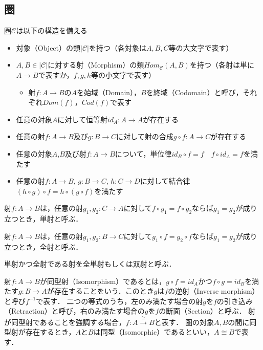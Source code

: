 \documentclass[type_judgement.tex]{subfiles}
\begin{document}
\subsection{圏}
\begin{defn}[Category（圏）]
圏$\mathcal{C}$は以下の構造を備える
\begin{itemize}
    \item 対象（Object）の類$|\mathcal{C}|$を持つ（各対象は$A,B,C$等の大文字で表す）
    \item $A,B\in|\mathcal{C}|$に対する射（Morphism）の類$Hom_\mathcal{C}(A,B)$を持つ（各射は単に$A \rightarrow B$で表すか，$f,g,h$等の小文字で表す）
        \begin{itemize}
            \item 射$f:A \rightarrow B$の$A$を始域（Domain），$B$を終域（Codomain）と呼び，それぞれ$Dom(f)$，$Cod(f)$で表す
        \end{itemize}
    \item 任意の対象$A$に対して恒等射$id_A:A \rightarrow A$が存在する
    \item 任意の射$f:A \rightarrow B$及び$g:B \rightarrow C$に対して射の合成$g \circ f: A \rightarrow C$が存在する
    \item 任意の対象$A$,$B$及び射$f:A \rightarrow B$について，単位律$id_B \circ f = f$　$f \circ id_A = f$を満たす
    \item 任意の射$f:A \rightarrow B$, $g:B \rightarrow C$, $h:C \rightarrow D$に対して結合律$(h \circ g) \circ f = h \circ (g \circ f)$を満たす
\end{itemize}

\begin{defn}[Monomorphism（単射）]
射$f:A \rightarrow B$は，任意の射$g_1,g_2:C \rightarrow A$に対して$f \circ g_1 = f \circ g_2$ならば$g_1 = g_2$が成り立つとき，単射と呼ぶ．
\end{defn}

\begin{defn}[Epimorphism（全射）]
射$f:A \rightarrow B$は，任意の射$g_1,g_2:B \rightarrow C$に対して$g_1 \circ f = g_2 \circ f$ならば$g_1 = g_2$が成り立つとき，全射と呼ぶ．
\end{defn}

\begin{defn}[Bimorphism（双射）]
単射かつ全射である射を全単射もしくは双射と呼ぶ．
\end{defn}

\begin{defn}
射$f:A \rightarrow B$が同型射（Isomorphism）であるとは，$g \circ f = id_A$かつ$f \circ g = id_B$を満たす$g:B \rightarrow A$が存在することをいう．このとき$g$は$f$の逆射（Inverse morphism）と呼び$f^{-1}$で表す．
二つの等式のうち，左のみ満たす場合の射$g$を$f$の引き込み（Retraction）と呼び，右のみ満たす場合の$g$を$f$の断面（Section）と呼ぶ．
射が同型射であることを強調する場合，$f:A \xrightarrow{\cong} B$と表す．
圏の対象$A,B$の間に同型射が存在するとき，$A$と$B$は同型（Isomorphic）であるといい，$A \cong B$で表す．
\end{defn}


\end{defn}
\end{document}
